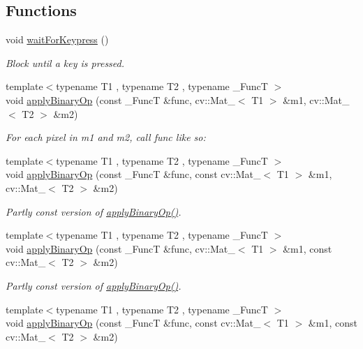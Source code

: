 \subsection*{Functions}
\begin{DoxyCompactItemize}
\item 
void \hyperlink{namespacecvutils_aa292da4b50c7692374fdde56afdd6baf}{wait\-For\-Keypress} ()
\begin{DoxyCompactList}\small\item\em Block until a key is pressed. \end{DoxyCompactList}\item 
{\footnotesize template$<$typename T1 , typename T2 , typename \-\_\-\-Func\-T $>$ }\\void \hyperlink{namespacecvutils_a9a51cd204369adbf1321482a67c101dc}{apply\-Binary\-Op} (const \-\_\-\-Func\-T \&func, cv\-::\-Mat\-\_\-$<$ T1 $>$ \&m1, cv\-::\-Mat\-\_\-$<$ T2 $>$ \&m2)
\begin{DoxyCompactList}\small\item\em For each pixel in {\ttfamily m1} and {\ttfamily m2}, call {\ttfamily func} like so\-: \end{DoxyCompactList}\item 
{\footnotesize template$<$typename T1 , typename T2 , typename \-\_\-\-Func\-T $>$ }\\void \hyperlink{namespacecvutils_a624390fc5d29f7ca9f2342f6ae7849be}{apply\-Binary\-Op} (const \-\_\-\-Func\-T \&func, const cv\-::\-Mat\-\_\-$<$ T1 $>$ \&m1, cv\-::\-Mat\-\_\-$<$ T2 $>$ \&m2)
\begin{DoxyCompactList}\small\item\em Partly const version of \hyperlink{namespacecvutils_a9a51cd204369adbf1321482a67c101dc}{apply\-Binary\-Op()}. \end{DoxyCompactList}\item 
{\footnotesize template$<$typename T1 , typename T2 , typename \-\_\-\-Func\-T $>$ }\\void \hyperlink{namespacecvutils_a18bf9198d170d4f95ebeda01c4c66b48}{apply\-Binary\-Op} (const \-\_\-\-Func\-T \&func, cv\-::\-Mat\-\_\-$<$ T1 $>$ \&m1, const cv\-::\-Mat\-\_\-$<$ T2 $>$ \&m2)
\begin{DoxyCompactList}\small\item\em Partly const version of \hyperlink{namespacecvutils_a9a51cd204369adbf1321482a67c101dc}{apply\-Binary\-Op()}. \end{DoxyCompactList}\item 
{\footnotesize template$<$typename T1 , typename T2 , typename \-\_\-\-Func\-T $>$ }\\void \hyperlink{namespacecvutils_a7de5d736aac8827c278399e59cdb62ce}{apply\-Binary\-Op} (const \-\_\-\-Func\-T \&func, const cv\-::\-Mat\-\_\-$<$ T1 $>$ \&m1, const cv\-::\-Mat\-\_\-$<$ T2 $>$ \&m2)

\end{DoxyCompactItemize}
